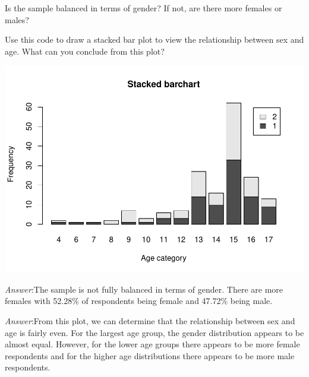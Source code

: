 \documentclass[
]{article}
\newenvironment{Shaded}{\begin{snugshade}}{\end{snugshade}}
\newcommand{\AttributeTok}[1]{\textcolor[rgb]{0.77,0.63,0.00}{#1}}
\newcommand{\ConstantTok}[1]{\textcolor[rgb]{0.00,0.00,0.00}{#1}}
\newcommand{\FunctionTok}[1]{\textcolor[rgb]{0.00,0.00,0.00}{#1}}
\newcommand{\NormalTok}[1]{#1}
\newcommand{\OtherTok}[1]{\textcolor[rgb]{0.56,0.35,0.01}{#1}}
\newcommand{\SpecialCharTok}[1]{\textcolor[rgb]{0.00,0.00,0.00}{#1}}
\newcommand{\StringTok}[1]{\textcolor[rgb]{0.31,0.60,0.02}{#1}}
\begin{document}
Is the sample balanced in terms of gender? If not, are there more
females or males?

Use this code to draw a stacked bar plot to view the relationship
between sex and age. What can you conclude from this plot?

\begin{Shaded}
\end{Shaded}

\includegraphics{Assignments_files/figure-latex/unnamed-chunk-11-1.pdf}

\emph{Answer}:The sample is not fully balanced in terms of gender. There
are more females with 52.28\% of respondents being female and 47.72\%
being male.

\emph{Answer}:From this plot, we can determine that the relationship
between sex and age is fairly even. For the largest age group, the
gender distribution appears to be almost equal. However, for the lower
age groups there appears to be more female respondents and for the
higher age distributions there appears to be more male respondents.
\end{document}
